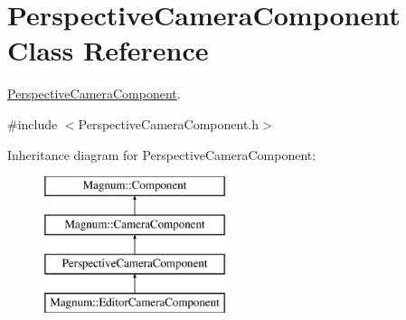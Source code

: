 \hypertarget{class_perspective_camera_component}{}\section{Perspective\+Camera\+Component Class Reference}
\label{class_perspective_camera_component}


\hyperlink{class_perspective_camera_component}{Perspective\+Camera\+Component}.  




{\ttfamily \#include $<$Perspective\+Camera\+Component.\+h$>$}

Inheritance diagram for Perspective\+Camera\+Component\+:\begin{figure}[H]
\begin{center}
\leavevmode
\includegraphics[height=4.000000cm]{class_perspective_camera_component}
\end{center}
\end{figure}
